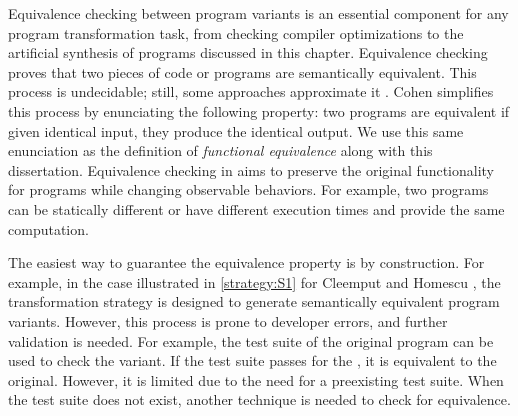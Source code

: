 Equivalence checking between program variants is an essential component for any program transformation task, from checking compiler optimizations \cite{LeCompilers} to the artificial synthesis of programs discussed in this chapter. 
Equivalence checking proves that two pieces of code or programs are semantically equivalent.
This process is undecidable; still, some approaches approximate it \cite{churchill2019}. %
Cohen \cite{cohen1993operating} simplifies this process by enunciating the following property: two programs are equivalent if given identical input, they produce the identical output. We use this same enunciation as the definition of \emph{functional equivalence} along with this dissertation. 
Equivalence checking in aims to preserve the original functionality for programs while changing observable behaviors. For example, two programs can be statically different or have different execution times and provide the same computation. 








The easiest way to guarantee the equivalence property is by construction. For example, in the case illustrated in \autoref{strategy:S1} for Cleemput \etal \cite{Cleemput2012} and Homescu \etal \cite{homescu2013profile}, the transformation strategy is designed to generate semantically equivalent program variants. However, this process is prone to developer errors, and further validation is needed. For example, the test suite of the original program can be used to check the variant. If the test suite passes for the \cite{harrand2020java}, it is equivalent to the original. However, it is limited due to the need for a preexisting test suite. When the test suite does not exist, another technique is needed to check for equivalence.

